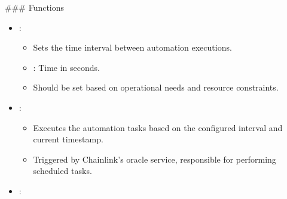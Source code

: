 \documentclass[a4paper,10pt,english]{sphinxmanual}
\begin{document}
\sphinxAtStartPar
\#\#\# Functions
\begin{itemize}
\item {} 
\sphinxAtStartPar
{}:

\begin{sphinxVerbatim}[commandchars=\\\{\}]
\end{sphinxVerbatim}
\begin{itemize}
\item {} 
\sphinxAtStartPar
{} Sets the time interval between automation executions.

\item {} 
\sphinxAtStartPar
{}
\sphinxhyphen{} : Time in seconds.

\item {} 
\sphinxAtStartPar
{} Should be set based on operational needs and resource constraints.

\end{itemize}

\item {} 
\sphinxAtStartPar
{}:

\begin{sphinxVerbatim}[commandchars=\\\{\}]
\end{sphinxVerbatim}
\begin{itemize}
\item {} 
\sphinxAtStartPar
{} Executes the automation tasks based on the configured interval and current timestamp.

\item {} 
\sphinxAtStartPar
{} Triggered by Chainlink’s oracle service, responsible for performing scheduled tasks.

\end{itemize}

\item {} 
\sphinxAtStartPar
{}:


\end{itemize}
\end{document}
